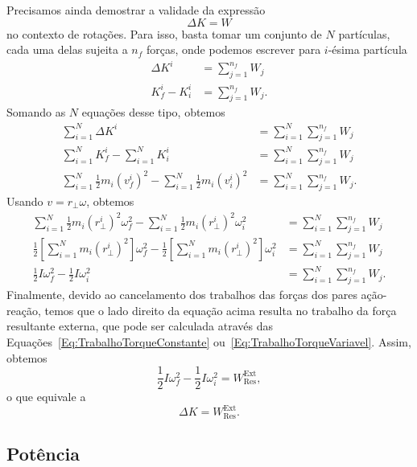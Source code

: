 Precisamos ainda demostrar a validade da expressão
\begin{equation}
    \Delta K = W
\end{equation}
%
no contexto de rotações. Para isso, basta tomar um conjunto de $N$ partículas, cada uma delas sujeita a $n_f$ forças, onde podemos escrever para $i$-ésima partícula
\begin{align}
    \Delta K^i &= \sum_{j=1}^{n_f} W_j \\
    K_f^i - K_i^i &= \sum_{j=1}^{n_f} W_j.
\end{align}
%
Somando as $N$ equações desse tipo, obtemos
\begin{align}
    \sum_{i = 1}^N \Delta K^i &= \sum_{i = 1}^N\sum_{j=1}^{n_f} W_j \\
    \sum_{i = 1}^N K_f^i - \sum_{i = 1}^N K_i^i &= \sum_{i = 1}^N\sum_{j=1}^{n_f} W_j \\
    \sum_{i = 1}^N \frac{1}{2}m_i (v_f^i)^2 - \sum_{i = 1}^N \frac{1}{2}m_i(v_i^i)^2 &= \sum_{i = 1}^N\sum_{j=1}^{n_f} W_j.
\end{align}
%
Usando $v = r_\perp \omega$, obtemos
\begin{align}
    \sum_{i = 1}^N \frac{1}{2}m_i (r_\perp^i)^2 \omega_f^2 - \sum_{i = 1}^N \frac{1}{2}m_i (r_\perp^i)^2\omega_i^2 &= \sum_{i = 1}^N\sum_{j=1}^{n_f} W_j \\
    \frac{1}{2}\left[\sum_{i = 1}^N m_i (r_\perp^i)^2\right]\omega_f^2 - \frac{1}{2}\left[\sum_{i = 1}^N m_i (r_\perp^i)^2\right]\omega_i^2 &= \sum_{i = 1}^N\sum_{j=1}^{n_f} W_j \\
    \frac{1}{2}I\omega_f^2 - \frac{1}{2}I\omega_i^2 &= \sum_{i = 1}^N\sum_{j=1}^{n_f} W_j.
\end{align}
%
Finalmente, devido ao cancelamento dos trabalhos das forças dos pares ação-reação, temos que o lado direito da equação acima resulta no trabalho da força resultante externa, que pode ser calculada através das Equações~\eqref{Eq:TrabalhoTorqueConstante} ou~\eqref{Eq:TrabalhoTorqueVariavel}. Assim, obtemos
\begin{equation}
    \frac{1}{2}I\omega_f^2 - \frac{1}{2}I\omega_i^2 = W_{\text{Res}}^{\text{Ext}},
\end{equation}
%
o que equivale a
\begin{equation}
    \Delta K = W_{\text{Res}}^{\text{Ext}}.
\end{equation}

\subsection{Potência}

